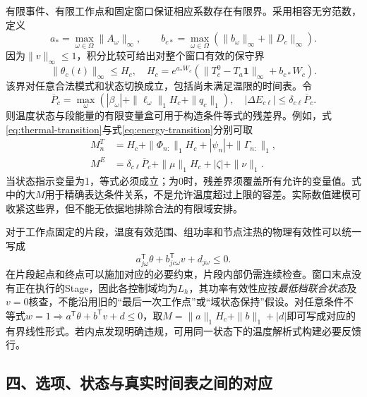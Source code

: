 有限事件、有限工作点和固定窗口保证相应系数存在有限界。采用相容无穷范数，定义
\begin{equation}
a_* =\max_{\omega\in\Omega}\|A_\omega\|_\infty,
\qquad b_{c*}=\max_{\omega\in\Omega}
\left(\|b_\omega\|_\infty+\|D_c\|_\infty\right).
\label{eq:norm-coefficients}
\end{equation}
因为$\|v\|_\infty\le1$，积分比较可给出对整个窗口有效的保守界
\begin{equation}
\|\theta_c(t)\|_\infty\le H_c,
\quad H_c=e^{a_*W_c}
\left(\|T_c^0-T_a\mathbf1\|_\infty+b_{c*}W_c\right).
\label{eq:state-bound}
\end{equation}
该界对任意合法模式和状态切换成立，包括尚未满足温限的时间表。令
\begin{equation}
\overline P_c=\max_\omega
\left(|\beta_\omega|+\|\ell_\omega\|_1H_c+\|q_c\|_1\right),
\quad|\Delta E_{c\ell}|\le\delta_{c\ell}\overline P_c.
\label{eq:energy-bound}
\end{equation}
则温度状态与段能量的有限变量盒可用于构造条件等式的残差界。例如，式\eqref{eq:thermal-transition}与式\eqref{eq:energy-transition}分别可取
\begin{equation}
\begin{aligned}
M^T_n&=H_c+\|\Phi_{n:}\|_1H_c+|\psi_n|+\|\Gamma_{n:}\|_1,\\
M^E&=\delta_{c\ell}\overline P_c+\|\mu\|_1H_c+|\zeta|+\|\nu\|_1.
\end{aligned}
\label{eq:residual-bounds}
\end{equation}
当状态指示变量为1，等式必须成立；为0时，残差界须覆盖所有允许的变量值。式中的大$M$用于精确表达条件关系，不是允许温度超过上限的容差。实际数值建模可收紧这些界，但不能无依据地排除合法的有限域安排。

对于工作点固定的片段，温度有效范围、组功率和节点注热的物理有效性可以统一写成
\begin{equation}
a_{j\omega}^{\mathsf T}\theta+b_{jc\omega}^{\mathsf T}v+d_{j\omega}\le0.
\label{eq:validity-affine}
\end{equation}
在片段起点和终点可以施加对应的必要约束，片段内部仍需连续检查。窗口末点没有正在执行的Stage，因此各控制域均为$L_h$，其功率有效性应按\emph{最低档联合状态}及$v=0$核查，不能沿用旧的“最后一次工作点”或“域状态保持”假设。对任意条件不等式$w=1\Rightarrow a^{\mathsf T}\theta+b^{\mathsf T}v+d\le0$，取$M=\|a\|_1H_c+\|b\|_1+|d|$即可写成对应的有界线性形式。若内点发现明确违规，可用同一状态下的温度解析式构建必要反馈行。

\subsection*{四、选项、状态与真实时间表之间的对应}

